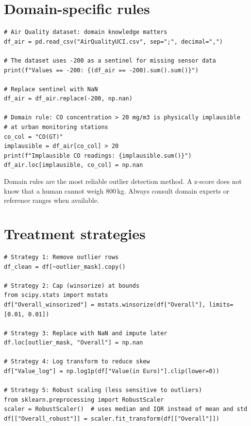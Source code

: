 \section{Domain-specific rules}

\begin{verbatim}
# Air Quality dataset: domain knowledge matters
df_air = pd.read_csv("AirQualityUCI.csv", sep=";", decimal=",")

# The dataset uses -200 as a sentinel for missing sensor data
print(f"Values == -200: {(df_air == -200).sum().sum()}")

# Replace sentinel with NaN
df_air = df_air.replace(-200, np.nan)

# Domain rule: CO concentration > 20 mg/m3 is physically implausible
# at urban monitoring stations
co_col = "CO(GT)"
implausible = df_air[co_col] > 20
print(f"Implausible CO readings: {implausible.sum()}")
df_air.loc[implausible, co_col] = np.nan
\end{verbatim}

\begin{datatip}
Domain rules are the most reliable outlier detection method. A z-score does not know that a human cannot weigh 800\,kg. Always consult domain experts or reference ranges when available.
\end{datatip}

\section{Treatment strategies}

\begin{verbatim}
# Strategy 1: Remove outlier rows
df_clean = df[~outlier_mask].copy()

# Strategy 2: Cap (winsorize) at bounds
from scipy.stats import mstats
df["Overall_winsorized"] = mstats.winsorize(df["Overall"], limits=[0.01, 0.01])

# Strategy 3: Replace with NaN and impute later
df.loc[outlier_mask, "Overall"] = np.nan

# Strategy 4: Log transform to reduce skew
df["Value_log"] = np.log1p(df["Value(in Euro)"].clip(lower=0))

# Strategy 5: Robust scaling (less sensitive to outliers)
from sklearn.preprocessing import RobustScaler
scaler = RobustScaler()  # uses median and IQR instead of mean and std
df[["Overall_robust"]] = scaler.fit_transform(df[["Overall"]])
\end{verbatim}

